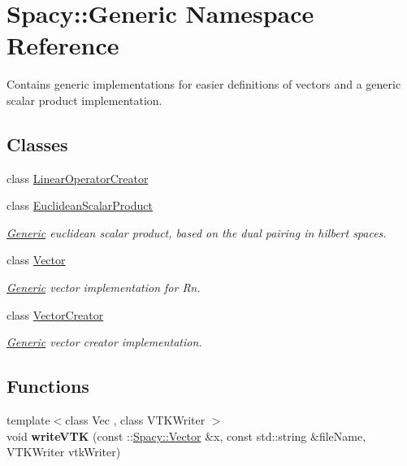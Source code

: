 \hypertarget{namespaceSpacy_1_1Generic}{\section{Spacy\-:\-:Generic Namespace Reference}
\label{namespaceSpacy_1_1Generic}
}


Contains generic implementations for easier definitions of vectors and a generic scalar product implementation.  


\subsection*{Classes}
\begin{DoxyCompactItemize}
\item 
class \hyperlink{classSpacy_1_1Generic_1_1LinearOperatorCreator}{Linear\-Operator\-Creator}
\item 
class \hyperlink{classSpacy_1_1Generic_1_1EuclideanScalarProduct}{Euclidean\-Scalar\-Product}
\begin{DoxyCompactList}\small\item\em \hyperlink{namespaceSpacy_1_1Generic}{Generic} euclidean scalar product, based on the dual pairing in hilbert spaces. \end{DoxyCompactList}\item 
class \hyperlink{classSpacy_1_1Generic_1_1Vector}{Vector}
\begin{DoxyCompactList}\small\item\em \hyperlink{namespaceSpacy_1_1Generic}{Generic} vector implementation for Rn. \end{DoxyCompactList}\item 
class \hyperlink{classSpacy_1_1Generic_1_1VectorCreator}{Vector\-Creator}
\begin{DoxyCompactList}\small\item\em \hyperlink{namespaceSpacy_1_1Generic}{Generic} vector creator implementation. \end{DoxyCompactList}\end{DoxyCompactItemize}
\subsection*{Functions}
\begin{DoxyCompactItemize}
\item 
\hypertarget{namespaceSpacy_1_1Generic_a2507c0093c30bbad744a860e4cbe54d4}{{\footnotesize template$<$class Vec , class V\-T\-K\-Writer $>$ }\\void {\bfseries write\-V\-T\-K} (const \-::\hyperlink{classSpacy_1_1Vector}{Spacy\-::\-Vector} \&x, const std\-::string \&file\-Name, V\-T\-K\-Writer vtk\-Writer)}\label{namespaceSpacy_1_1Generic_a2507c0093c30bbad744a860e4cbe54d4}

\end{DoxyCompactItemize}



